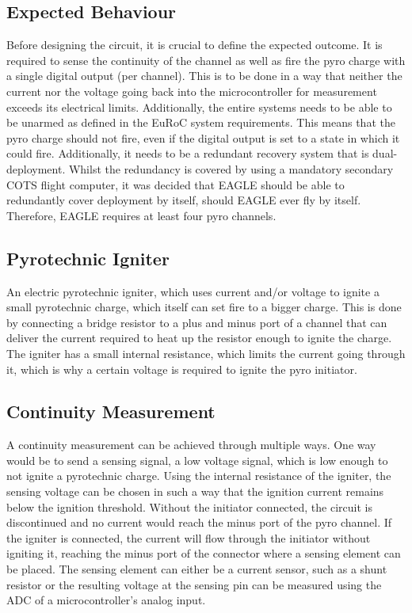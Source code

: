 \documentclass[fontsize=11pt,%
twoside,%
BCOR          = 8mm, %
DIV           = 11,  %
titlepage     = off,%
index=totoc,%
xcolor        = pdftex,%
dvipsnames,%
bibliography  = totoc,%
bibliography = numbered, %
listof        = notnumbered]{scrreprt}
\begin{document}
\subsection{Expected Behaviour}
Before designing the circuit, it is crucial to define the expected outcome. It is required to sense the continuity of the channel as well as fire the pyro charge with a single digital output (per channel). This is to be done in a way that neither the current nor the voltage going back into the microcontroller for measurement exceeds its electrical limits. Additionally, the entire systems needs to be able to be unarmed as defined in the EuRoC system requirements. This means that the pyro charge should not fire, even if the digital output is set to a state in which it could fire. Additionally, it needs to be a redundant recovery system that is dual-deployment. Whilst the redundancy is covered by using a mandatory secondary COTS flight computer, it was decided that EAGLE should be able to redundantly cover deployment by itself, should EAGLE ever fly by itself. Therefore, EAGLE requires at least four pyro channels.\\

\subsection{Pyrotechnic Igniter}
An electric pyrotechnic igniter, which uses current and/or voltage to ignite a small pyrotechnic charge, which itself can set fire to a bigger charge. This is done by connecting a bridge resistor to a plus and minus port of a channel that can deliver the current required to heat up the resistor enough to ignite the charge. The igniter has a small internal resistance, which limits the current going through it, which is why a certain voltage is required to ignite the pyro initiator.

\subsection{Continuity Measurement}
A continuity measurement can be achieved through multiple ways. One way would be to send a sensing signal, a low voltage signal, which is low enough to not ignite a pyrotechnic charge. Using the internal resistance of the igniter, the sensing voltage can be chosen in such a way that the ignition current remains below the ignition threshold. Without the initiator connected, the circuit is discontinued and no current would reach the minus port of the pyro channel. If the igniter is connected, the current will flow through the initiator without igniting it, reaching the minus port of the connector where a sensing element can be placed. The sensing element can either be a current sensor, such as a shunt resistor or the resulting voltage at the sensing pin can be measured using the ADC of a microcontroller's analog input.
\end{document}

